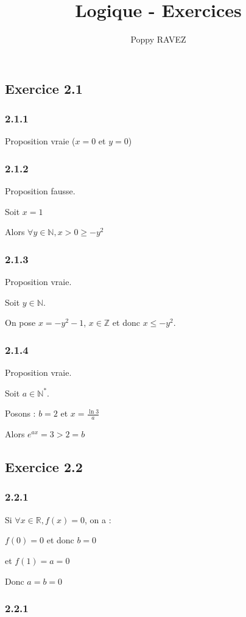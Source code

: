 \documentclass[a4paper,10pt]{report}
\title{Logique - Exercices}
\author{Poppy RAVEZ}
\begin{document}
	
	
\subsection*{Exercice 2.1}

\subsubsection*{2.1.1}
Proposition vraie ($x=0$ et $y=0$)

\subsubsection*{2.1.2}
Proposition fausse.

Soit $x=1$

Alors $\forall y \in \mathbb{N}, x > 0 \geq -y^2$

\subsubsection*{2.1.3}
Proposition vraie.

Soit $y \in \mathbb{N}$.

On pose $x = -y^2 -1$, $x \in \mathbb{Z}$ et donc $x \leq -y^2$.

\subsubsection*{2.1.4}
Proposition vraie.

Soit $a \in \mathbb{N}^*$.

Posons : $b = 2$ et $x= \frac{\ln 3}{a}$

Alors $e^{ax} = 3 > 2 = b$


\subsection*{Exercice 2.2}
\subsubsection*{2.2.1}

Si $\forall x \in \mathbb{R}, f(x)=0$, on a :

$f(0) = 0$ et donc $b=0$

et $f(1) = a = 0$

Donc $a=b=0$

\subsubsection*{2.2.1}
\end{document}
